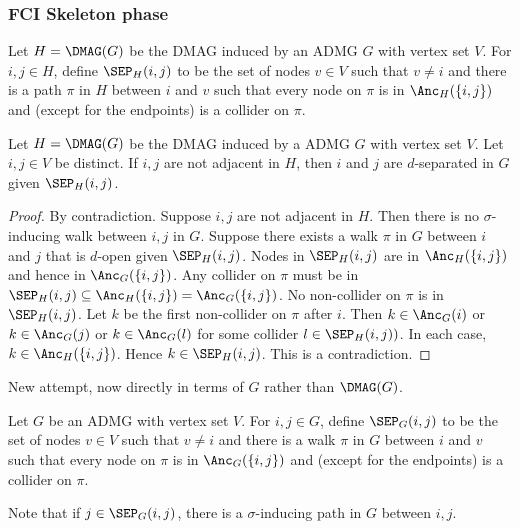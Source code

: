 \subsubsection{FCI Skeleton phase}

\begin{Def}
  Let $H = \DMAG(G)$ be the DMAG induced by an ADMG $G$ with vertex set $V$.
  For $i,j \in H$, define $\SEP_H(i,j)$ to be the set of nodes $v \in V$ such that
  $v \ne i$ and there is a path $\pi$ in $H$ between $i$ and $v$ such that every node
  on $\pi$ is in $\Anc_H(\{i,j\})$ and (except for the endpoints) is a collider on $\pi$.
\end{Def}

\begin{Prp}
  Let $H = \DMAG(G)$ be the DMAG induced by a ADMG $G$ with vertex set $V$.
  Let $i,j \in V$ be distinct.
  If $i,j$ are not adjacent in $H$, then $i$ and $j$ are $d$-separated in $G$ given $\SEP_H(i,j)$.
\end{Prp}
\begin{proof}
  By contradiction.
  Suppose $i,j$ are not adjacent in $H$.
  Then there is no $\sigma$-inducing walk between $i,j$ in $G$.
  Suppose there exists a walk $\pi$ in $G$ between $i$ and $j$ that is $d$-open given $\SEP_H(i,j)$.
  Nodes in $\SEP_H(i,j)$ are in $\Anc_H(\{i,j\})$ and hence in $\Anc_G(\{i,j\})$.
  Any collider on $\pi$ must be in $\SEP_H(i,j) \subseteq \Anc_H(\{i,j\}) = \Anc_G(\{i,j\})$.
  No non-collider on $\pi$ is in $\SEP_H(i,j)$.
  Let $k$ be the first non-collider on $\pi$ after $i$.
  Then $k \in \Anc_G(i)$ or $k \in \Anc_G(j)$ or $k \in \Anc_G(l)$ for some collider $l \in \SEP_H(i,j))$.
  In each case, $k \in \Anc_H(\{i,j\})$.
  Hence $k \in \SEP_H(i,j)$.
  This is a contradiction.
\end{proof}

New attempt, now directly in terms of $G$ rather than $\DMAG(G)$.

\begin{Def}
  Let $G$ be an ADMG with vertex set $V$.
  For $i,j \in G$, define $\SEP_G(i,j)$ to be the set of nodes $v \in V$ such that
  $v \ne i$ and there is a walk $\pi$ in $G$ between $i$ and $v$ such that every node
  on $\pi$ is in $\Anc_G(\{i,j\})$ and (except for the endpoints) is a collider on $\pi$.
\end{Def}
Note that if $j \in \SEP_G(i,j)$, there is a $\sigma$-inducing path in $G$ between $i,j$.

